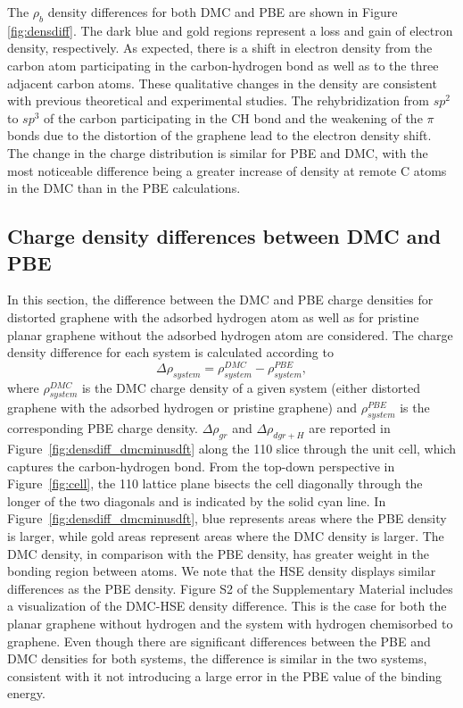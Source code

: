 The $\rho_b$ density differences for both DMC and PBE are shown in Figure \ref{fig:densdiff}. 
The dark blue and gold regions represent a loss and gain of electron density, respectively.
As expected, there is a shift in electron density from the carbon atom participating in the carbon-hydrogen bond as well as to the three adjacent carbon atoms. 
These qualitative changes in the density are consistent with previous theoretical and experimental studies.\cite{doi:10.1063/1.4896611,doi:10.1126/science.aaw6378}
The rehybridization from $sp^2$ to $sp^3$ of the carbon participating in the CH bond and the weakening of the $\pi$ bonds due to the distortion of the graphene lead to the electron density shift.
The change in the charge distribution is similar for PBE and DMC, with the most noticeable difference being a greater increase of density at remote C atoms in the DMC than in the PBE calculations.

\subsection{Charge density differences between DMC and PBE}
In this section, the difference between the DMC and PBE charge densities for distorted graphene with the adsorbed hydrogen atom as well as for pristine planar graphene without the adsorbed hydrogen atom are considered. 
The charge density difference for each system is calculated according to 
\begin{equation}
    \Delta\rho_{system} =\rho_{system}^{DMC}- \rho_{system}^{PBE},
    \label{eq:densdiff}
\end{equation}
where $\rho_{system}^{DMC}$ is the DMC charge density of a given system (either distorted graphene with the adsorbed hydrogen or pristine graphene) and $\rho_{system}^{PBE}$ is the corresponding PBE charge density.
$\Delta\rho_{gr}$ and $\Delta\rho_{dgr+H}$ are reported in Figure~\ref{fig:densdiff_dmcminusdft} along the 110 slice through the unit cell, which captures the carbon-hydrogen bond.
From the top-down perspective in Figure~\ref{fig:cell}, the 110 lattice plane bisects the cell diagonally through the longer of the two diagonals and is indicated by the solid cyan line.
In Figure~\ref{fig:densdiff_dmcminusdft}, blue represents areas where the PBE density is larger, while gold areas represent areas where the DMC density is larger.
The DMC density, in comparison with the PBE density, has greater weight in the bonding region between atoms.
We note that the HSE density displays similar differences as the PBE density. Figure S2 of the Supplementary Material includes a visualization of the DMC-HSE density difference.
This is the case for both the planar graphene without hydrogen and the system with hydrogen chemisorbed to graphene.
Even though there are significant differences between the PBE and DMC densities for both systems, the difference is similar in the two systems, consistent with it not introducing a large error in the PBE value of the binding energy.


